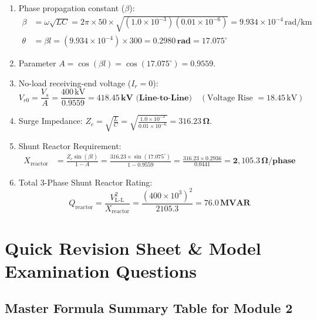 \documentclass[11pt,a4paper]{article}
\newenvironment{Solution}[1][Step-by-Step Solution]{\begin{tcolorbox}[solbox, title=#1]}{\end{tcolorbox}}
\begin{document}
\begin{Solution}
\begin{enumerate}
  \item Phase propagation constant ($\beta$):
    \begin{align*}
      \beta &= \omega \sqrt{L C} = 2\pi \times 50 \times \sqrt{(1.0 \times 10^{-3})(0.01 \times 10^{-6})} = 9.934 \times 10^{-4}\,\text{rad/km} \\
      \theta &= \beta l = (9.934 \times 10^{-4}) \times 300 = \mathbf{0.2980\,\text{rad}} = \mathbf{17.075^\circ}
    \end{align*}
  \item Parameter $A = \cos(\beta l) = \cos(17.075^\circ) = \mathbf{0.9559}$.
  \item No-load receiving-end voltage ($I_r = 0$):
    \begin{equation*}
      V_{r0} = \frac{V_s}{A} = \frac{400\,\text{kV}}{0.9559} = \mathbf{418.45\,\text{kV (Line-to-Line)}} \quad (\text{Voltage Rise } = 18.45\,\text{kV})
    \end{equation*}
  \item Surge Impedance: $Z_c = \sqrt{\frac{L}{C}} = \sqrt{\frac{1.0 \times 10^{-3}}{0.01 \times 10^{-6}}} = \mathbf{316.23\,\Omega}$.
  \item Shunt Reactor Requirement:
    \begin{align*}
      X_{\text{reactor}} &= \frac{Z_c \sin(\beta l)}{1 - A} = \frac{316.23 \times \sin(17.075^\circ)}{1 - 0.9559} = \frac{316.23 \times 0.2936}{0.0441} = \mathbf{2,105.3\,\Omega/\text{phase}}
    \end{align*}
  \item Total 3-Phase Shunt Reactor Rating:
    \begin{equation*}
      Q_{\text{reactor}} = \frac{V_{\text{L-L}}^2}{X_{\text{reactor}}} = \frac{(400 \times 10^3)^2}{2105.3} = \mathbf{76.0\,\text{MVAR}}
    \end{equation*}
\end{enumerate}
\end{Solution}

\clearpage
\section{Quick Revision Sheet \& Model Examination Questions}

\subsection{Master Formula Summary Table for Module 2}
\end{document}

